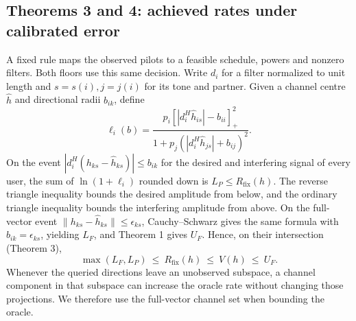 \documentclass[11pt,letterpaper]{article}
\newcommand{\pos}[1]{\left[#1\right]_{+}}
\newcommand{\fix}{R_{\mathrm{fix}}}
\begin{document}
\subsection*{Theorems 3 and 4: achieved rates under calibrated error}
A fixed rule maps the observed pilots to a feasible schedule, powers and nonzero filters. Both floors use this same decision. Write \(d_i\) for a filter normalized to unit length and \(s=s(i),j=j(i)\) for its tone and partner. Given a channel centre \(\hat h\) and directional radii \(b_{ik}\), define
\[
 \ell_i(b)=\frac{p_i\pos{|d_i^H\hat h_{is}|-b_{ii}}^2}
                 {1+p_j(|d_i^H\hat h_{js}|+b_{ij})^2}.
\]
On the event \(|d_i^H(h_{ks}-\hat h_{ks})|\leq b_{ik}\) for the desired and interfering signal of every user, the sum of \(\ln(1+\ell_i)\) rounded down is \(L_P\leq\fix(h)\). The reverse triangle inequality bounds the desired amplitude from below, and the ordinary triangle inequality bounds the interfering amplitude from above. On the full-vector event \(\|h_{ks}-\hat h_{ks}\|\leq\epsilon_{ks}\), Cauchy--Schwarz gives the same formula with \(b_{ik}=\epsilon_{ks}\), yielding \(L_F\), and Theorem 1 gives \(U_F\). Hence, on their intersection (Theorem 3),
\[
       \max(L_F,L_P)\ \leq\ \fix(h)\ \leq\ V(h)\ \leq\ U_F .
\]
Whenever the queried directions leave an unobserved subspace, a channel component in that subspace can increase the oracle rate without changing those projections. We therefore use the full-vector channel set when bounding the oracle.
\end{document}
